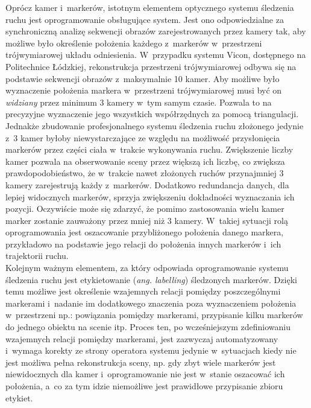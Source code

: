 Oprócz kamer i~markerów, istotnym elementem optycznego systemu śledzenia ruchu jest oprogramowanie obsługujące system. Jest ono odpowiedzialne za synchroniczną analizę sekwencji obrazów zarejestrowanych przez kamery tak, aby możliwe było określenie położenia każdego z~markerów w~przestrzeni trójwymiarowej układu odniesienia. W~przypadku systemu Vicon, dostępnego na Politechnice Łódzkiej, rekonstrukcja przestrzeni trójwymiarowej odbywa się na podstawie sekwencji obrazów z~maksymalnie 10 kamer. Aby możliwe było wyznaczenie położenia markera w~przestrzeni trójwymiarowej musi być on \textsl{widziany} przez minimum 3 kamery w~tym samym czasie. Pozwala to na precyzyjne wyznaczenie jego wszystkich współrzędnych za pomocą triangulacji. Jednakże zbudowanie profesjonalnego systemu śledzenia ruchu złożonego jedynie z~3 kamer byłoby niewystarczające ze względu na możliwość przysłonięcia markerów przez części ciała w~trakcie wykonywania ruchu. Zwiększenie liczby kamer pozwala na obserwowanie sceny przez większą ich liczbę, co zwiększa prawdopodobieństwo, że w~trakcie nawet złożonych ruchów przynajmniej 3 kamery zarejestrują każdy z~markerów. Dodatkowo redundancja danych, dla lepiej widocznych markerów, sprzyja zwiększeniu dokładności wyznaczania ich pozycji. Oczywiście może się zdarzyć, że pomimo zastosowania wielu kamer marker zostanie zauważony przez mniej niż 3 kamery. W~takiej sytuacji rolą oprogramowania jest oszacowanie przybliżonego położenia danego markera, przykładowo na podstawie jego relacji do położenia innych markerów i~ich trajektorii ruchu.\\
			
Kolejnym ważnym elementem, za który odpowiada oprogramowanie systemu śledzenia ruchu jest etykietowanie (\emph{ang. labelling}) śledzonych markerów. Dzięki temu możliwe jest określenie wzajemnych relacji pomiędzy poszczególnymi markerami i~nadanie im dodatkowego znaczenia poza wyznaczeniem położenia w~przestrzeni np.: powiązania pomiędzy markerami, przypisanie kilku markerów do jednego obiektu na scenie itp. Proces ten, po wcześniejszym zdefiniowaniu wzajemnych relacji pomiędzy markerami, jest zazwyczaj automatyzowany i~wymaga korekty ze strony operatora systemu jedynie w~sytuacjach kiedy nie jest możliwa pełna rekonstrukcja sceny, np. gdy zbyt wiele markerów jest niewidocznych dla kamer i~oprogramowanie nie jest w~stanie oszacować ich położenia, a~co za tym idzie niemożliwe jest prawidłowe przypisanie zbioru etykiet.\\ 
			
